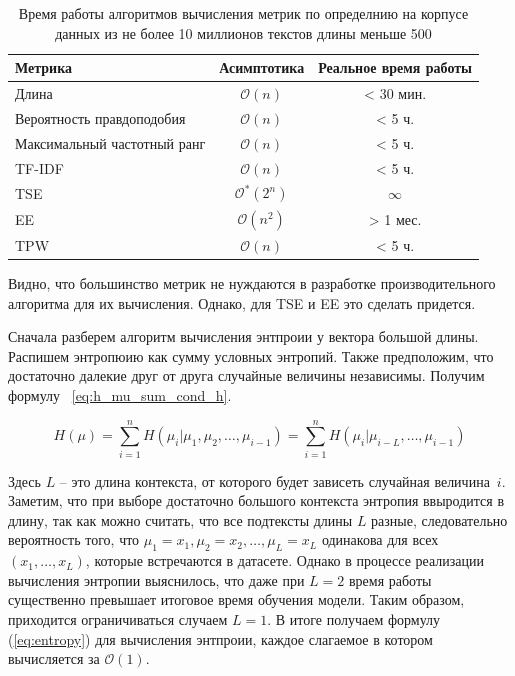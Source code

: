 \documentclass{spbau-diploma}
\begin{document}
\begin{table}[h]
	\caption{Время работы алгоритмов вычисления метрик по определнию на корпусе данных из не более 10 миллионов текстов длины меньше 500}		\label{table:def_metrics_asymptotics}
	\centering
	\begin{tabular}{|l|c|c|}
		\hline
		Метрика & Асимптотика & Реальное время работы \\
		\hline
		Длина & $\mathcal{O}(n)$ & < 30 мин. \\
		Вероятность правдоподобия & $\mathcal{O}(n)$ & < 5 ч.\\
		Максимальный частотный ранг & $\mathcal{O}(n)$ & < 5 ч. \\
		\hline
		TF-IDF & $\mathcal{O}(n)$ & < 5 ч. \\
		\hline
		TSE & $\mathcal{O}^*(2^n)$ & {\bf $\infty$} \\
		EE & $\mathcal{O}(n^2)$ & > 1 мес. \\
		TPW & $\mathcal{O}(n)$ & < 5 ч. \\
		\hline
	\end{tabular}
\end{table}

Видно, что большинство метрик не нуждаются в разработке производительного алгоритма для их вычисления. Однако, для TSE и EE это сделать придется.

Сначала разберем алгоритм вычисления энтпроии у вектора большой длины. Распишем энтропюию как сумму условных энтропий. Также предположим, что достаточно далекие друг от друга случайные величины независимы. Получим формулу~ \ref{eq:h_mu_sum_cond_h}.

\begin{equation} \label{eq:h_mu_sum_cond_h}
H(\mu) = \sum\limits_{i=1}^{n}H(\mu_i|\mu_1,\mu_2,\ldots,\mu_{i-1}) = \sum\limits_{i=1}^{n}H(\mu_i|\mu_{i-L},\ldots,\mu_{i-1})
\end{equation}

Здесь $L$ -- это длина контекста, от которого будет зависеть случайная величина~$i$. Заметим, что при выборе достаточно большого контекста энтропия ввыродится в длину, так как можно считать, что все подтексты длины $L$ разные, следовательно вероятность того, что $\mu_1=x_1,\mu_2=x_2,\ldots,\mu_L=x_L$ одинакова для всех $(x_1,\ldots,x_L)$, которые встречаются в датасете. Однако в процессе реализации вычисления энтропии выяснилось, что даже при $L = 2$ время работы существенно превышает итоговое время обучения модели. Таким образом, приходится ограничиваться случаем $L=1$. В итоге получаем формулу (\ref{eq:entropy}) для вычисления энтпроии, каждое слагаемое в котором вычисляется за $\mathcal{O}(1)$.
\end{document}
